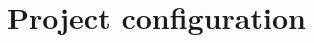 \documentclass[../PiTest.tex]{subfiles}
\begin{document}
\section{Project configuration}

    
\end{document}
